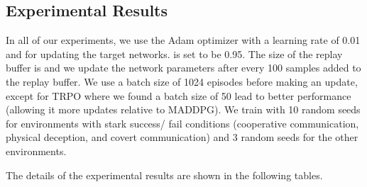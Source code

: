 \documentclass{article}
\begin{document}
\iffalse
\begin{algorithm}[H]
 \SetAlgoLined
  \begin{algorithmic}
    \FOR{}
      \FOR{}
\STATE Select actions  w.r.t.\@ current policy, observe reward  and new state 
          \STATE Store  in replay buffer  \FOR{agent }
            \STATE Sample a random minibatch of  samples  from 
            \STATE Set 
            \STATE Update critic by minimizing the loss 
            \STATE Update actor using the sampled policy gradient:
            
          \ENDFOR     
          \STATE Update target network parameters for each agent :
          
      \ENDFOR
    \ENDFOR
  \end{algorithmic}
 \caption{Multi-Agent Deep Deterministic Policy Gradient for  agents}
\end{algorithm}
\fi

\subsection*{Experimental Results}
\label{sec:tables}

In all of our experiments, we use the Adam optimizer with a learning rate of 0.01 and  for updating the target networks.  is set to be 0.95. The size of the replay buffer is  and we update the network parameters after every 100 samples added to the replay buffer. We use a batch size of 1024 episodes before making an update, except for TRPO where we found a batch size of 50 lead to better performance (allowing it more updates relative to MADDPG). We train with 10 random seeds for environments with stark success/ fail conditions (cooperative communication, physical deception, and covert communication) and 3 random seeds for the other environments.

The details of the experimental results are shown in the following tables.
\end{document}
